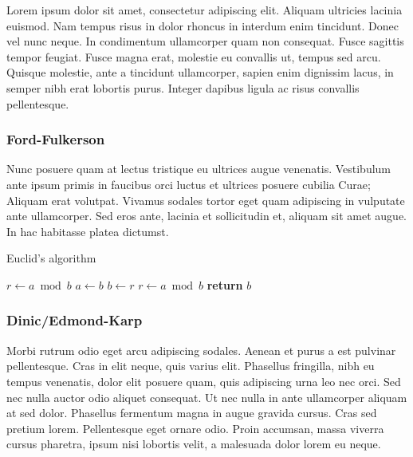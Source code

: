 Lorem ipsum dolor sit amet, consectetur adipiscing elit. Aliquam ultricies lacinia euismod. Nam tempus risus in dolor rhoncus in interdum enim tincidunt. Donec vel nunc neque. In condimentum ullamcorper quam non consequat. Fusce sagittis tempor feugiat. Fusce magna erat, molestie eu convallis ut, tempus sed arcu. Quisque molestie, ante a tincidunt ullamcorper, sapien enim dignissim lacus, in semper nibh erat lobortis purus. Integer dapibus ligula ac risus convallis pellentesque.

\subsubsection{Ford-Fulkerson}

Nunc posuere quam at lectus tristique eu ultrices augue venenatis. Vestibulum ante ipsum primis in faucibus orci luctus et ultrices posuere cubilia Curae; Aliquam erat volutpat. Vivamus sodales tortor eget quam adipiscing in vulputate ante ullamcorper. Sed eros ante, lacinia et sollicitudin et, aliquam sit amet augue. In hac habitasse platea dictumst.

\begin{algorithm}
	\caption{Euclid’s algorithm}\label{alg:euclid}
	\begin{algorithmic}[1]
		\State $r\gets a\bmod b$
		\State $a\gets b$
		\State $b\gets r$
		\State $r\gets a\bmod b$
		\EndWhile\label{euclidendwhile}
		\State \textbf{return} $b$
		\EndProcedure
	\end{algorithmic}
\end{algorithm}


\subsubsection{Dinic/Edmond-Karp}
Morbi rutrum odio eget arcu adipiscing sodales. Aenean et purus a est pulvinar pellentesque. Cras in elit neque, quis varius elit. Phasellus fringilla, nibh eu tempus venenatis, dolor elit posuere quam, quis adipiscing urna leo nec orci. Sed nec nulla auctor odio aliquet consequat. Ut nec nulla in ante ullamcorper aliquam at sed dolor. Phasellus fermentum magna in augue gravida cursus. Cras sed pretium lorem. Pellentesque eget ornare odio. Proin accumsan, massa viverra cursus pharetra, ipsum nisi lobortis velit, a malesuada dolor lorem eu neque.

